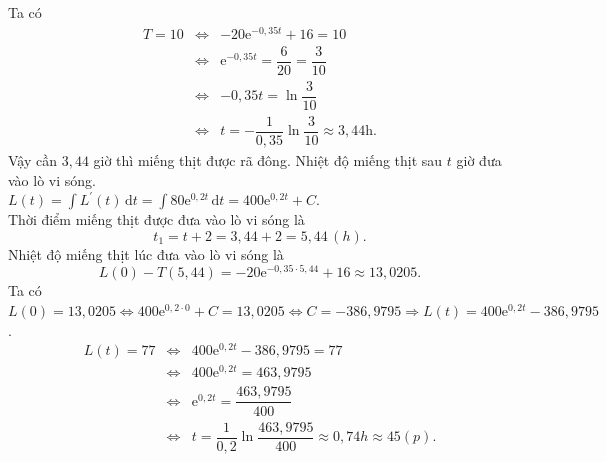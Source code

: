 \begin{ex}
{\begin{itemchoice}
\itemch Ta có
\allowdisplaybreaks
\begin{eqnarray*}
T=10&\Leftrightarrow&-20 \mathrm{e}^{-0{,}35 t}+16=10\\
&\Leftrightarrow&\mathrm{e}^{-0{,}35 t}=\dfrac{6}{20}=\dfrac{3}{10}\\
&\Leftrightarrow&-0{,}35 t=\ln \dfrac{3}{10} \\
&\Leftrightarrow&t=-\dfrac{1}{0{,}35} \ln \dfrac{3}{10} \approx 3{,}44 \text{h}.
\end{eqnarray*}
Vậy cần $3{,}44$ giờ thì miếng thịt được rã đông.
\itemch Nhiệt độ miếng thịt sau $t$ giờ đưa vào lò vi sóng.\\
$L(t)=\displaystyle\int L^{\prime}(t) \mathrm{\,d}t=\displaystyle\int 80\mathrm{e}^{0{,}2t} \mathrm{\,d}t =400 \mathrm{e}^{0{,}2t}+C$.\\
Thời điểm miếng thịt được đưa vào lò vi sóng là
\[t_1=t+2=3{,}44+2=5{,}44\,(h).\]
Nhiệt độ miếng thịt lúc đưa vào lò vi sóng là
\[L(0)-T(5{,}44)=-20\mathrm{e}^{-0{,}35\cdot5{,}44}+16\approx13{,}0205.\]
Ta có $L(0)=13{,}0205\Leftrightarrow 400\mathrm{e}^{0{,}2\cdot0}+C=13{,}0205\Leftrightarrow C=-386{,}9795\Rightarrow L(t)=400 \mathrm{e}^{0{,}2t}-386{,}9795$.
\allowdisplaybreaks
\begin{eqnarray*}
L(t)=77&\Leftrightarrow&400 \mathrm{e}^{0{,}2t}-386{,}9795=77\\
&\Leftrightarrow&400 \mathrm{e}^{0{,}2t}=463{,}9795\\
&\Leftrightarrow& \mathrm{e}^{0{,}2t}=\dfrac{463{,}9795}{400}\\
&\Leftrightarrow& t=\dfrac{1}{0{,}2}\ln\dfrac{463{,}9795}{400}\approx0{,}74h\approx45(p).
\end{eqnarray*}
\end{itemchoice}
}
\end{ex}

